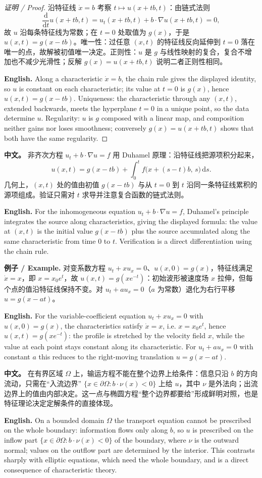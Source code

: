 \documentclass[UTF8,11pt,a4paper]{ctexart}
\newcommand{\APS}[2]{\par\noindent\textbf{中文。} #1\par\noindent\textbf{English.} #2\par\smallskip}
\newcommand{\EN}[1]{\par\noindent \textbf{English.} #1\par}
\newcommand{\EX}[2]{\par\noindent \textbf{例子 / Example.} #1\par\EN{#2}}
\newcommand{\dd}{\mathrm{d}}
\begin{document}
\begin{proof}[证明 / Proof]
沿特征线 $\dot x=b$ 考察 $t\mapsto u(x+tb,t)$：由链式法则
\[
\frac{\dd}{\dd t}u(x+tb,t)=u_t(x+tb,t)+b\cdot\nabla u(x+tb,t)=0,
\]
故 $u$ 沿每条特征线为常数；在 $t=0$ 处取值为 $g(x)$，于是 $u(x,t)=g(x-tb)$。唯一性：过任意 $(x,t)$ 的特征线反向延伸到 $t=0$ 落在唯一的点，故解被初值唯一决定。正则性：$u$ 是 $g$ 与线性映射的复合，复合不增加也不减少光滑性；反解 $g(x)=u(x+tb,t)$ 说明二者正则性相同。\EN{Along a characteristic $\dot x=b$, the chain rule gives the displayed identity, so $u$ is constant on each characteristic; its value at $t=0$ is $g(x)$, hence $u(x,t)=g(x-tb)$. Uniqueness: the characteristic through any $(x,t)$, extended backwards, meets the hyperplane $t=0$ in a unique point, so the data determine $u$. Regularity: $u$ is $g$ composed with a linear map, and composition neither gains nor loses smoothness; conversely $g(x)=u(x+tb,t)$ shows that both have the same regularity.}
\end{proof}

\APS{非齐次方程 $u_t+b\cdot\nabla u=f$ 用 Duhamel 原理：沿特征线把源项积分起来，
\[
u(x,t)=g(x-tb)+\int_0^t f\bigl(x+(s-t)b,\,s\bigr)\,\dd s .
\]
几何上，$(x,t)$ 处的值由初值 $g(x-tb)$ 与从 $t=0$ 到 $t$ 沿同一条特征线累积的源项组成。验证只需对 $t$ 求导并注意复合函数的链式法则。}{For the inhomogeneous equation $u_t+b\cdot\nabla u=f$, Duhamel's principle integrates the source along characteristics, giving the displayed formula: the value at $(x,t)$ is the initial value $g(x-tb)$ plus the source accumulated along the same characteristic from time $0$ to $t$. Verification is a direct differentiation using the chain rule.}

\EX{对变系数方程 $u_t+xu_x=0$、$u(x,0)=g(x)$，特征线满足 $\dot x=x$，即 $x=x_0e^t$，故 $u(x,t)=g(xe^{-t})$：初始波形被速度场 $x$ 拉伸，但每个点的值沿特征线保持不变。对 $u_t+au_x=0$（$a$ 为常数）退化为右行平移 $u=g(x-at)$。}{For the variable-coefficient equation $u_t+xu_x=0$ with $u(x,0)=g(x)$, the characteristics satisfy $\dot x=x$, i.e. $x=x_0e^t$, hence $u(x,t)=g(xe^{-t})$: the profile is stretched by the velocity field $x$, while the value at each point stays constant along its characteristic. For $u_t+au_x=0$ with constant $a$ this reduces to the right-moving translation $u=g(x-at)$.}

\APS{在有界区域 $\Omega$ 上，输运方程不能在整个边界上给条件：信息只沿 $b$ 的方向流动，只需在``入流边界'' $\{x\in\partial\Omega: b\cdot\nu(x)<0\}$ 上给 $u$，其中 $\nu$ 是外法向；出流边界上的值由内部决定。这一点与椭圆方程``整个边界都要给''形成鲜明对照，也是特征理论决定定解条件的直接体现。}{On a bounded domain $\Omega$ the transport equation cannot be prescribed on the whole boundary: information flows only along $b$, so $u$ is prescribed on the inflow part $\{x\in\partial\Omega: b\cdot\nu(x)<0\}$ of the boundary, where $\nu$ is the outward normal; values on the outflow part are determined by the interior. This contrasts sharply with elliptic equations, which need the whole boundary, and is a direct consequence of characteristic theory.}
\end{document}
